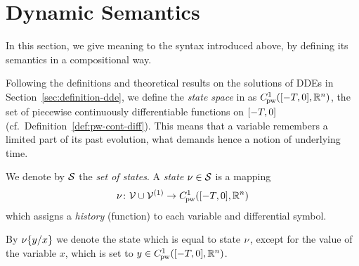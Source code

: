 \section{Dynamic Semantics}
    \label{sec:dynamic-semantics}


    In this section, we give meaning to the syntax introduced above, by defining its semantics in a compositional way.

    Following the definitions and theoretical results on the solutions of  DDEs in Section~\ref{sec:definition-dde}, we define the \emph{state space} in \ddL as $\statespace$, the set of piecewise continuously differentiable functions on $\closeddelayinterval$ (cf.\ Definition~\ref{def:pw-cont-diff}).
    This means that a variable remembers a limited part of its past evolution, what demands hence a notion of underlying time.

    We denote by $\states$ the \emph{set of states}. A \emph{state} $\asstate\in\states$ is a mapping
    \begin{equation}
        \asstate \from \allvars\cup\diffvars \to \statespace
    \end{equation}
    which assigns a \emph{history} (function) to each variable and differential symbol.

    By $\modif{\asstate}{x}{y}$ we denote the state which is equal to state $\asstate$, except for the value of the variable $x$, which is set to $y\in\statespace$.


    


